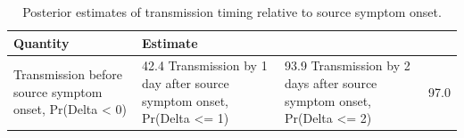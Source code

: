 \begin{table}[ht]
\centering
\caption{Posterior estimates of transmission timing relative to source symptom onset.}
\begin{tabular}{ll}
\hline
Quantity & Estimate \\
\hline
Transmission before source symptom onset, Pr(Delta < 0) & 42.4%
Transmission by 1 day after source symptom onset, Pr(Delta <= 1) & 93.9%
Transmission by 2 days after source symptom onset, Pr(Delta <= 2) & 97.0%
\hline
\end{tabular}
\end{table}
